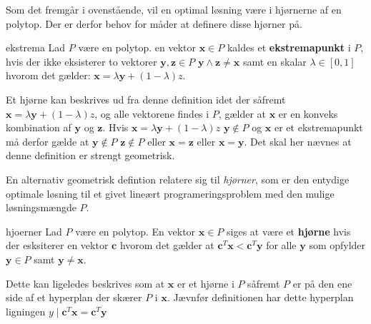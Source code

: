 Som det fremgår i ovenstående, vil en optimal løsning være i hjørnerne af en polytop.
Der er derfor behov for måder at definere disse hjørner på.

\begin{defn}{}{ekstrema}
Lad $P$ være en polytop. en vektor $\mathbf{x} \in P$ kaldes et \textbf{ekstremapunkt} i $P$, hvis der ikke eksisterer to vektorer $\mathbf{y},\mathbf{z} \in P$ $\mathbf{y} \land \mathbf{z} \neq \mathbf{x}$ samt en skalar $\lambda \in [0,1]$ hvorom det gælder: $\mathbf{x}=\lambda\mathbf{y}+(1-\lambda)z$.
\end{defn}
Et hjørne kan beskrives ud fra denne definition idet der såfremt $\mathbf{x}=\lambda\mathbf{y}+(1-\lambda)z$, og alle vektorene findes i $P$, gælder at $\mathbf{x}$ er en konveks kombination af $\mathbf{y}$ og $\mathbf{z}$.
Hvis $\mathbf{x}=\lambda\mathbf{y}+(1-\lambda)z$ $\mathbf{y}\notin P$ og $\mathbf{x}$ er et ekstremapunkt må derfor gælde at $\mathbf{y}\notin P$ $\mathbf{z}\notin P$ eller $\mathbf{x}=\mathbf{z}$ eller $\mathbf{x}=\mathbf{y}$. 
Det skal her nævnes at denne definition er strengt geometrisk.



En alternativ geometrisk defintion relatere sig til \textit{hjørner}, som er den entydige optimale løsning til et givet lineært programeringsproblem med den mulige løsningsmængde $P$.
\begin{defn}{}{hjoerner}
Lad $P$ være en polytop. En vektor $\mathbf{x}\in P$ siges at være et \textbf{hjørne} hvis der esksiterer en vektor $\mathbf{c}$ hvorom det gælder at $\mathbf{c}^T\mathbf{x}<\mathbf{c}^T\mathbf{y}$ for alle $\mathbf{y}$ som opfylder $\mathbf{y} \in P$ samt $\mathbf{y}\neq\mathbf{x}$.
\end{defn}
Dette kan ligeledes beskrives som at $\mathbf{x}$ er et hjørne i $P$ såfremt $P$ er på den ene side af et hyperplan der skærer $P$ i $\mathbf{x}$. Jævnfør definitionen har dette hyperplan ligningen $y \mid \mathbf{c}^T\mathbf{x}=\mathbf{c}^T\mathbf{y}$